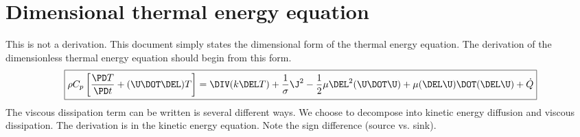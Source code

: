 \documentclass[11pt]{article}
\begin{document}
\doublespacing
\MOONSTITLE
\maketitle

\section{Dimensional thermal energy equation}
This is not a derivation. This document simply states the dimensional form of the thermal energy equation. The derivation of the dimensionless thermal energy equation should begin from this form.
\begin{equation}
	\boxed{
	\rho C_p \left[ \frac{\PD T}{\PD t}
	+ (\U \DOT \DEL) T \right]
	= \DIV (k \DEL T)
	+ \frac{1}{\sigma} \J^2
	- \frac{1}{2} \mu \DEL^2 (\U \DOT \U)
	+ \mu (\DEL \U) \DOT (\DEL \U)
	+ \dot{Q}
	}
\end{equation}
The viscous dissipation term can be written is several different ways. We choose to decompose into kinetic energy diffusion and viscous dissipation. The derivation is in the kinetic energy equation. Note the sign difference (source vs. sink).
\end{document}
